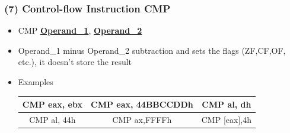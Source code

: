 \documentclass[]{beamer}
\begin{document}
\begin{frame}
  \frametitle{(7) Control-flow Instruction CMP}
  \begin{itemize}
  \item{CMP \underline{\textbf{Operand\_1}}, \underline{\textbf{Operand\_2}}}\\

  \item{Operand\_1 minus Operand\_2 subtraction and sets the flags (ZF,CF,OF, etc.), it doesn't store the result}
  \item{Examples}
    \begin{table}[h]
      \begin{tabular}{|c|c|c|}
        \hline
        CMP eax, ebx&CMP eax, 44BBCCDDh&CMP al, dh\\
        \hline
        CMP al, 44h&CMP ax,FFFFh&CMP [eax],4h\\
        \hline
      \end{tabular}
    \end{table}
  \end{itemize}
\end{frame}
\end{document}
